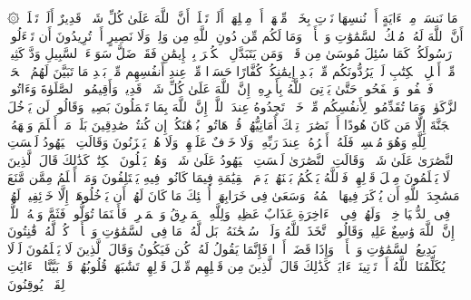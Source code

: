 \stopbuffer
\startbuffer[\q:2:106]
۞ مَا نَنسَخۡ مِنۡ ءَایَةٍ أَوۡ نُنسِهَا نَأۡتِ بِخَیۡرࣲ مِّنۡهَاۤ أَوۡ مِثۡلِهَاۤۗ أَلَمۡ تَعۡلَمۡ أَنَّ ٱللَّهَ عَلَىٰ كُلِّ شَیۡءࣲ قَدِیرٌ%
\stopbuffer
\startbuffer[\q:2:107]
أَلَمۡ تَعۡلَمۡ أَنَّ ٱللَّهَ لَهُۥ مُلۡكُ ٱلسَّمَٰوَٰتِ وَٱلۡأَرۡضِۗ وَمَا لَكُم مِّن دُونِ ٱللَّهِ مِن وَلِیࣲّ وَلَا نَصِیرٍ%
\stopbuffer
\startbuffer[\q:2:108]
أَمۡ تُرِیدُونَ أَن تَسۡءَلُوا۟ رَسُولَكُمۡ كَمَا سُئِلَ مُوسَىٰ مِن قَبۡلُۗ وَمَن یَتَبَدَّلِ ٱلۡكُفۡرَ بِٱلۡإِیمَٰنِ فَقَدۡ ضَلَّ سَوَاۤءَ ٱلسَّبِیلِ%
\stopbuffer
\startbuffer[\q:2:109]
وَدَّ كَثِیرࣱ مِّنۡ أَهۡلِ ٱلۡكِتَٰبِ لَوۡ یَرُدُّونَكُم مِّنۢ بَعۡدِ إِیمَٰنِكُمۡ كُفَّارًا حَسَدࣰا مِّنۡ عِندِ أَنفُسِهِم مِّنۢ بَعۡدِ مَا تَبَیَّنَ لَهُمُ ٱلۡحَقُّۖ فَٱعۡفُوا۟ وَٱصۡفَحُوا۟ حَتَّىٰ یَأۡتِیَ ٱللَّهُ بِأَمۡرِهِۦۤۗ إِنَّ ٱللَّهَ عَلَىٰ كُلِّ شَیۡءࣲ قَدِیرࣱ%
\stopbuffer
\startbuffer[\q:2:110]
وَأَقِیمُوا۟ ٱلصَّلَوٰةَ وَءَاتُوا۟ ٱلزَّكَوٰةَۚ وَمَا تُقَدِّمُوا۟ لِأَنفُسِكُم مِّنۡ خَیۡرࣲ تَجِدُوهُ عِندَ ٱللَّهِۗ إِنَّ ٱللَّهَ بِمَا تَعۡمَلُونَ بَصِیرࣱ%
\stopbuffer
\startbuffer[\q:2:111]
وَقَالُوا۟ لَن یَدۡخُلَ ٱلۡجَنَّةَ إِلَّا مَن كَانَ هُودًا أَوۡ نَصَٰرَىٰۗ تِلۡكَ أَمَانِیُّهُمۡۗ قُلۡ هَاتُوا۟ بُرۡهَٰنَكُمۡ إِن كُنتُمۡ صَٰدِقِینَ%
\stopbuffer
\startbuffer[\q:2:112]
بَلَىٰۚ مَنۡ أَسۡلَمَ وَجۡهَهُۥ لِلَّهِ وَهُوَ مُحۡسِنࣱ فَلَهُۥۤ أَجۡرُهُۥ عِندَ رَبِّهِۦ وَلَا خَوۡفٌ عَلَیۡهِمۡ وَلَا هُمۡ یَحۡزَنُونَ%
\stopbuffer
\startbuffer[\q:2:113]
وَقَالَتِ ٱلۡیَهُودُ لَیۡسَتِ ٱلنَّصَٰرَىٰ عَلَىٰ شَیۡءࣲ وَقَالَتِ ٱلنَّصَٰرَىٰ لَیۡسَتِ ٱلۡیَهُودُ عَلَىٰ شَیۡءࣲ وَهُمۡ یَتۡلُونَ ٱلۡكِتَٰبَۗ كَذَٰلِكَ قَالَ ٱلَّذِینَ لَا یَعۡلَمُونَ مِثۡلَ قَوۡلِهِمۡۚ فَٱللَّهُ یَحۡكُمُ بَیۡنَهُمۡ یَوۡمَ ٱلۡقِیَٰمَةِ فِیمَا كَانُوا۟ فِیهِ یَخۡتَلِفُونَ%
\stopbuffer
\startbuffer[\q:2:114]
وَمَنۡ أَظۡلَمُ مِمَّن مَّنَعَ مَسَٰجِدَ ٱللَّهِ أَن یُذۡكَرَ فِیهَا ٱسۡمُهُۥ وَسَعَىٰ فِی خَرَابِهَاۤۚ أُو۟لَٰۤئِكَ مَا كَانَ لَهُمۡ أَن یَدۡخُلُوهَاۤ إِلَّا خَاۤئِفِینَۚ لَهُمۡ فِی ٱلدُّنۡیَا خِزۡیࣱ وَلَهُمۡ فِی ٱلۡءَاخِرَةِ عَذَابٌ عَظِیمࣱ%
\stopbuffer
\startbuffer[\q:2:115]
وَلِلَّهِ ٱلۡمَشۡرِقُ وَٱلۡمَغۡرِبُۚ فَأَیۡنَمَا تُوَلُّوا۟ فَثَمَّ وَجۡهُ ٱللَّهِۚ إِنَّ ٱللَّهَ وَٰسِعٌ عَلِیمࣱ%
\stopbuffer
\startbuffer[\q:2:116]
وَقَالُوا۟ ٱتَّخَذَ ٱللَّهُ وَلَدࣰاۗ سُبۡحَٰنَهُۥۖ بَل لَّهُۥ مَا فِی ٱلسَّمَٰوَٰتِ وَٱلۡأَرۡضِۖ كُلࣱّ لَّهُۥ قَٰنِتُونَ%
\stopbuffer
\startbuffer[\q:2:117]
بَدِیعُ ٱلسَّمَٰوَٰتِ وَٱلۡأَرۡضِۖ وَإِذَا قَضَىٰۤ أَمۡرࣰا فَإِنَّمَا یَقُولُ لَهُۥ كُن فَیَكُونُ%
\stopbuffer
\startbuffer[\q:2:118]
وَقَالَ ٱلَّذِینَ لَا یَعۡلَمُونَ لَوۡلَا یُكَلِّمُنَا ٱللَّهُ أَوۡ تَأۡتِینَاۤ ءَایَةࣱۗ كَذَٰلِكَ قَالَ ٱلَّذِینَ مِن قَبۡلِهِم مِّثۡلَ قَوۡلِهِمۡۘ تَشَٰبَهَتۡ قُلُوبُهُمۡۗ قَدۡ بَیَّنَّا ٱلۡءَایَٰتِ لِقَوۡمࣲ یُوقِنُونَ%
